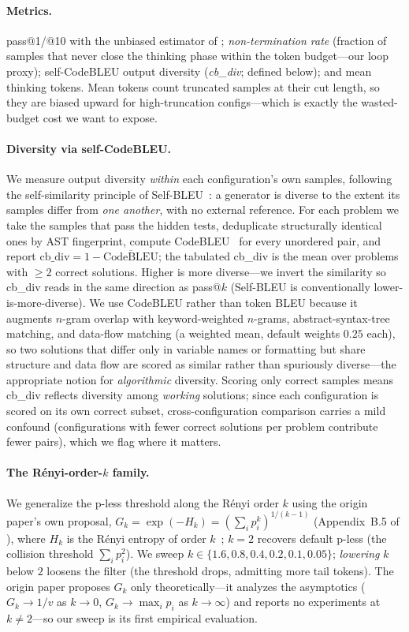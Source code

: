 \documentclass[11pt]{article}                       %
\newcommand{\tsum}{\ensuremath{\textstyle\sum}}
\begin{document}
\paragraph{Metrics.} pass@1/@10 with the unbiased estimator of \citet{chen2021humaneval};
\emph{non-termination rate} (fraction of samples that never close the thinking phase within the token
budget---our loop proxy); self-CodeBLEU output diversity (\emph{cb\_div}; defined below); and mean
thinking tokens. Mean tokens count truncated samples at their cut length, so they are biased upward for
high-truncation configs---which is exactly the wasted-budget cost we want to expose.

\paragraph{Diversity via self-CodeBLEU.} We measure output diversity \emph{within} each
configuration's own samples, following the self-similarity principle of Self-BLEU~\citep{zhu2018texygen}:
a generator is diverse to the extent its samples differ from \emph{one another}, with no external
reference. For each problem we take the samples that pass the hidden tests, deduplicate structurally
identical ones by AST fingerprint, compute CodeBLEU~\citep{ren2020codebleu} for every unordered pair,
and report $\mathrm{cb\_div}=1-\overline{\mathrm{CodeBLEU}}$; the tabulated cb\_div is the mean over
problems with $\ge 2$ correct solutions. Higher is more diverse---we invert the similarity so cb\_div
reads in the same direction as pass@$k$ (Self-BLEU is conventionally lower-is-more-diverse). We use
CodeBLEU rather than token BLEU because it augments $n$-gram overlap with keyword-weighted $n$-grams,
abstract-syntax-tree matching, and data-flow matching (a weighted mean, default weights $0.25$ each),
so two solutions that differ only in variable names or formatting but share structure and data flow are
scored as similar rather than spuriously diverse---the appropriate notion for \emph{algorithmic}
diversity. Scoring only correct samples means cb\_div reflects diversity among \emph{working} solutions;
since each configuration is scored on its own correct subset, cross-configuration comparison carries a
mild confound (configurations with fewer correct solutions per problem contribute fewer pairs), which
we flag where it matters.

\paragraph{The R\'enyi-order-$k$ family.} We generalize the p-less threshold along the R\'enyi order
$k$ using the origin paper's own proposal, $G_k=\exp(-H_k)=(\tsum_i p_i^k)^{1/(k-1)}$
(Appendix~B.5 of \citet{tan2025pless}), where $H_k$ is the R\'enyi entropy of order $k$~\citep{renyi1961measures};
$k{=}2$ recovers default p-less (the collision threshold $\tsum_i p_i^2$). We sweep
$k\in\{1.6,0.8,0.4,0.2,0.1,0.05\}$; \emph{lowering} $k$ below $2$ loosens the filter (the threshold
drops, admitting more tail tokens). The origin paper proposes $G_k$ only theoretically---it analyzes
the asymptotics ($G_k\!\to\!1/v$ as $k\!\to\!0$, $G_k\!\to\!\max_i p_i$ as $k\!\to\!\infty$) and reports
no experiments at $k\neq2$---so our sweep is its first empirical evaluation.
\end{document}
